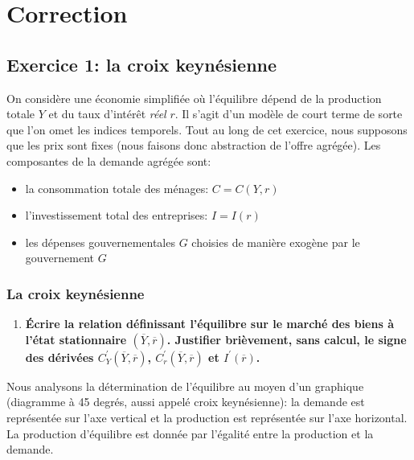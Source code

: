 \documentclass[
]{article}
\author{}
\date{}
\providecommand{\tightlist}{%
  \setlength{\itemsep}{0pt}\setlength{\parskip}{0pt}}
\begin{document}
\hypertarget{correction}{%
\section{Correction}\label{correction}}

\hypertarget{exercice-1-la-croix-keynuxe9sienne}{%
\subsection{Exercice 1: la croix
keynésienne}\label{exercice-1-la-croix-keynuxe9sienne}}

On considère une économie simplifiée où l'équilibre dépend de la
production totale \(Y\) et du taux d'intérêt \emph{réel} \(r\). Il
s'agit d'un modèle de court terme de sorte que l'on omet les indices
temporels. Tout au long de cet exercice, nous supposons que les prix
sont fixes (nous faisons donc abstraction de l'offre agrégée). Les
composantes de la demande agrégée sont:

\begin{itemize}
\tightlist
\item
  la consommation totale des ménages: \(C=C(Y,r)\)
\item
  l'investissement total des entreprises: \(I=I(r)\)
\item
  les dépenses gouvernementales \(G\) choisies de manière exogène par le
  gouvernement \(G\)
\end{itemize}

\hypertarget{la-croix-keynuxe9sienne}{%
\subsubsection{La croix keynésienne}\label{la-croix-keynuxe9sienne}}

\begin{enumerate}
\def\labelenumi{\arabic{enumi}.}
\tightlist
\item
  \textbf{Écrire la relation définissant l'équilibre sur le marché des
  biens à l'état stationnaire \((\overline{Y},\overline{r})\). Justifier
  brièvement, sans calcul, le signe des dérivées
  \(C^{\prime}_Y(\overline{Y},\overline{r})\),
  \(C^{\prime}_r(\overline{Y},\overline{r})\) et
  \(I^{\prime}(\overline{r})\).}
\end{enumerate}

Nous analysons la détermination de l'équilibre au moyen d'un graphique
(diagramme à 45 degrés, aussi appelé croix keynésienne): la demande est
représentée sur l'axe vertical et la production est représentée sur
l'axe horizontal. La production d'équilibre est donnée par l'égalité
entre la production et la demande.
\end{document}
